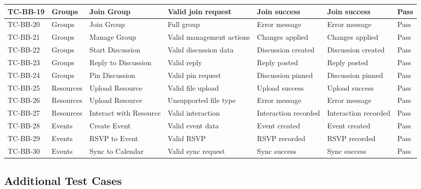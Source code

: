 {\begin{longtable}{|C{1.5cm}|C{2.2cm}|C{2cm}|C{2cm}|C{2cm}|C{2cm}|C{1cm}|}
\hline
TC-BB-19 & Groups & Join Group & Valid join request & Join success & Join success & Pass \\
\hline
TC-BB-20 & Groups & Join Group & Full group & Error message & Error message & Pass \\
\hline
TC-BB-21 & Groups & Manage Group & Valid management actions & Changes applied & Changes applied & Pass \\
\hline
TC-BB-22 & Groups & Start Discussion & Valid discussion data & Discussion created & Discussion created & Pass \\
\hline
TC-BB-23 & Groups & Reply to Discussion & Valid reply & Reply posted & Reply posted & Pass \\
\hline
TC-BB-24 & Groups & Pin Discussion & Valid pin request & Discussion pinned & Discussion pinned & Pass \\
\hline
TC-BB-25 & Resources & Upload Resource & Valid file upload & Upload success & Upload success & Pass \\
\hline
TC-BB-26 & Resources & Upload Resource & Unsupported file type & Error message & Error message & Pass \\
\hline
TC-BB-27 & Resources & Interact with Resource & Valid interaction & Interaction recorded & Interaction recorded & Pass \\
\hline
TC-BB-28 & Events & Create Event & Valid event data & Event created & Event created & Pass \\
\hline
TC-BB-29 & Events & RSVP to Event & Valid RSVP & RSVP recorded & RSVP recorded & Pass \\
\hline
TC-BB-30 & Events & Sync to Calendar & Valid sync request & Sync success & Sync success & Pass \\
\hline
\end{longtable}
}

\subsection{Additional Test Cases}

